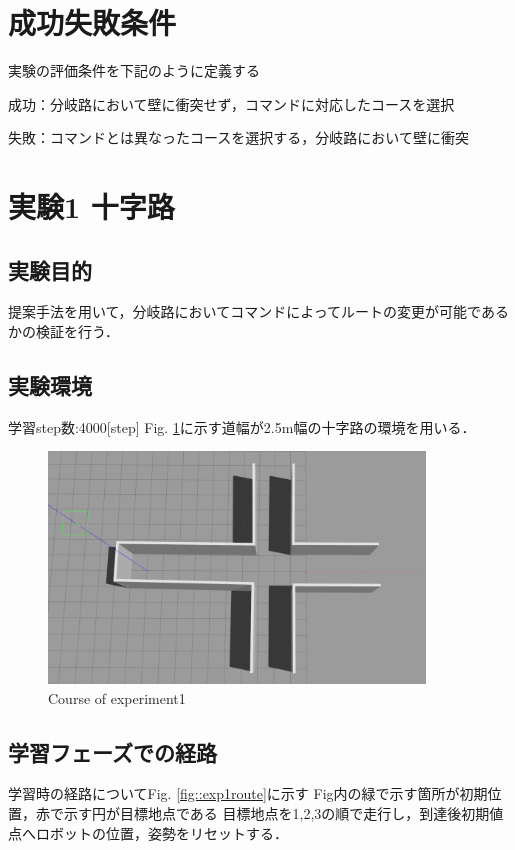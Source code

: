 \section{成功失敗条件}
実験の評価条件を下記のように定義する

成功：分岐路において壁に衝突せず，コマンドに対応したコースを選択

失敗：コマンドとは異なったコースを選択する，分岐路において壁に衝突

\newpage
\section{実験1 十字路}
\subsection{実験目的}
提案手法を用いて，分岐路においてコマンドによってルートの変更が可能であるかの検証を行う．
\subsection{実験環境}
学習step数:4000[step]
Fig. \ref{fig::zyuzi}に示す道幅が2.5m幅の十字路の環境を用いる．
\begin{figure}[ht]
    \centering
    \includegraphics[width = 10cm]{./figs/zyuuziyoko.png}
    \caption{Course of experiment1}
    \label{fig::zyuzi}
\end{figure}

\newpage
\subsection{学習フェーズでの経路}
学習時の経路についてFig. \ref{fig::exp1route}に示す
Fig内の緑で示す箇所が初期位置，赤で示す円が目標地点である
目標地点を1,2,3の順で走行し，到達後初期値点へロボットの位置，姿勢をリセットする．

